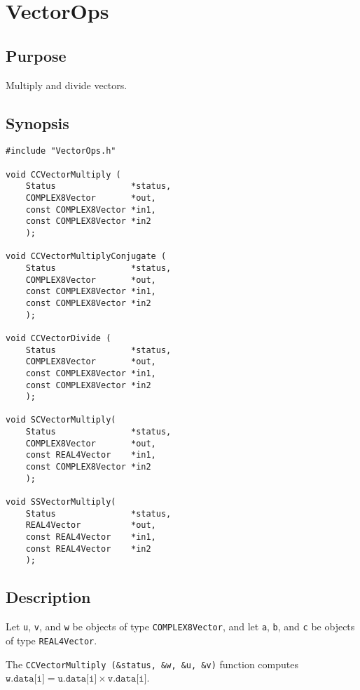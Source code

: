 \documentclass{article}
\begin{document}
\section{VectorOps}

\subsection{Purpose}

Multiply and divide vectors.

\subsection{Synopsis}


\begin{verbatim}
#include "VectorOps.h"

void CCVectorMultiply (
    Status               *status,
    COMPLEX8Vector       *out, 
    const COMPLEX8Vector *in1,
    const COMPLEX8Vector *in2
    );

void CCVectorMultiplyConjugate (
    Status               *status,
    COMPLEX8Vector       *out, 
    const COMPLEX8Vector *in1,
    const COMPLEX8Vector *in2
    );

void CCVectorDivide (
    Status               *status,
    COMPLEX8Vector       *out, 
    const COMPLEX8Vector *in1,
    const COMPLEX8Vector *in2
    );

void SCVectorMultiply(
    Status               *status,
    COMPLEX8Vector       *out,
    const REAL4Vector    *in1,
    const COMPLEX8Vector *in2
    );

void SSVectorMultiply(
    Status               *status,
    REAL4Vector          *out,
    const REAL4Vector    *in1,
    const REAL4Vector    *in2
    );

\end{verbatim}

\subsection{Description}

Let \texttt{u}, \texttt{v}, and \texttt{w} be objects of type
\texttt{COMPLEX8Vector}, and let \texttt{a}, \texttt{b}, and \texttt{c} be
objects of type \texttt{REAL4Vector}.

The \verb:CCVectorMultiply (&status, &w, &u, &v): function computes
$\texttt{w.data[i]}=\texttt{u.data[i]}\times\texttt{v.data[i]}$.
\end{document}
